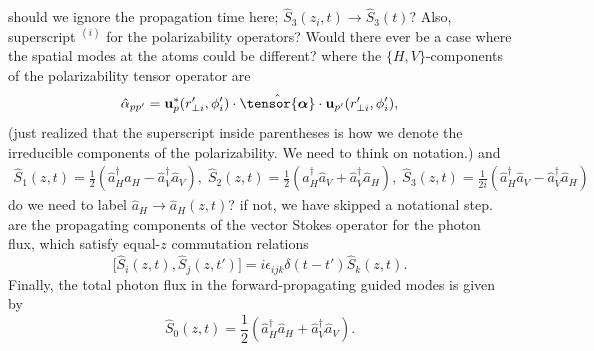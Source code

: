 \documentclass[preprint,aps,pra,onecolumn]{revtex4-1} %
\newcommand{\poltens}{\hat{\tensor{\boldsymbol{\alpha}}}}
\newcommand{\comment}[1]{{\color{Maroon} #1}}
\newcommand{\error}[1]{{\color{red} #1}}
\begin{document}
\comment{should we ignore the propagation time here; $\hat{S}_3(z_i,t) \rightarrow \hat{S}_3(t)$?  Also, superscript $\phantom{}^{(i)}$ for the polarizability operators?  Would there ever be a case where the spatial modes at the atoms could be different?}  where the $\{H,V\}$-components of the polarizability tensor operator are
\begin{equation}  
	\hat{\alpha}_{p p'} = \mathbf{u}^*_p(r'_{\perp i},\phi'_i)  \cdot \poltens \cdot \mathbf{u}_{p'}(r'_{\perp i},\phi'_i),
\end{equation}
\error{(just realized that the superscript inside parentheses is how we denote the irreducible components of the polarizability.  We need to think on notation.)} and
	\begin{align}
		\hat{S}_1(z,t) = \frac{1}{2}\left(\hat{a}^\dag_H \hat{a}_H-\hat{a}^\dag_V \hat{a}_V \right), \; \hat{S}_2(z,t) = \frac{1}{2}\left(\hat{a}^\dag_H \hat{a}_V+\hat{a}^\dag_V \hat{a}_H \right), \; \hat{S}_3(z,t) = \frac{1}{2i}\left(\hat{a}^\dag_H \hat{a}_V-\hat{a}^\dag_V \hat{a}_H \right) 
	\end{align}
\comment{ do we need to label $\hat{a}_H \rightarrow \hat{a}_H(z,t)$? if not, we have skipped a notational step.} are the propagating components of the vector Stokes operator for the photon flux, which satisfy equal-$z$ commutation relations
	\begin{equation}
		\big[\hat{S}_i(z,t), \hat{S}_j(z,t')\big] =i \epsilon_{ijk} \delta(t-t')  \hat{S}_k(z,t).
	\end{equation}
Finally, the total photon flux in the forward-propagating guided modes is given by
	\begin{equation}
		\hat{S}_0(z,t) = \frac{1}{2}\left(\hat{a}^\dag_H \hat{a}_H+\hat{a}^\dag_V \hat{a}_V \right).
	\end{equation}
\end{document}
